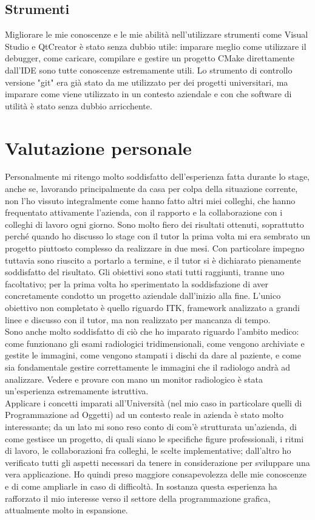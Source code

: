 \subsection{Strumenti}
Migliorare le mie conoscenze e le mie abilità nell'utilizzare strumenti come Visual Studio e QtCreator è stato senza dubbio utile: imparare meglio come utilizzare il debugger, come caricare, compilare e gestire un progetto CMake direttamente dall'IDE sono tutte conoscenze estremamente utili. Lo strumento di controllo versione "git" era già stato da me utilizzato per dei progetti universitari, ma imparare come viene utilizzato in un contesto aziendale e con che software di utilità è stato senza dubbio arricchente.

\section{Valutazione personale}
Personalmente mi ritengo molto soddisfatto dell'esperienza fatta durante lo stage, anche se, lavorando principalmente da casa per colpa della situazione corrente, non l'ho vissuto integralmente come hanno fatto altri miei colleghi, che hanno frequentato attivamente l'azienda, con il rapporto e la collaborazione con i colleghi di lavoro ogni giorno. Sono molto fiero dei risultati ottenuti, soprattutto perché quando ho discusso lo stage con il tutor la prima volta mi era sembrato un progetto piuttosto complesso da realizzare in due mesi. Con particolare impegno tuttavia sono riuscito a portarlo a termine, e il tutor si è dichiarato pienamente soddisfatto del risultato. Gli obiettivi sono stati tutti raggiunti, tranne uno facoltativo; per la prima volta ho sperimentato la soddisfazione di aver concretamente condotto un progetto aziendale dall'inizio alla fine. L'unico obiettivo non completato è quello riguardo ITK, framework analizzato a grandi linee e discusso con il tutor, ma non realizzato per mancanza di tempo.
\\
Sono anche molto soddisfatto di ciò che ho imparato riguardo l'ambito medico: come funzionano gli esami radiologici tridimensionali, come vengono archiviate e gestite le immagini, come vengono stampati i dischi da dare al paziente, e come sia fondamentale gestire correttamente le immagini che il radiologo andrà ad analizzare. Vedere e provare con mano un monitor radiologico è stata un'esperienza estremamente istruttiva.
\\
Applicare i concetti imparati all’Università (nel mio caso in particolare quelli di
Programmazione ad Oggetti) ad un contesto reale in azienda è stato molto interessante;
da un lato mi sono reso conto di com’è strutturata un’azienda, di come gestisce un progetto, di quali siano le specifiche figure professionali, i ritmi di lavoro, le collaborazioni fra colleghi, le scelte implementative; dall’altro ho verificato tutti gli aspetti necessari da tenere in considerazione per sviluppare una vera applicazione. Ho quindi preso maggiore consapevolezza delle mie conoscenze e di come ampliarle in caso di difficoltà. In sostanza questa esperienza ha rafforzato il mio interesse verso il settore della programmazione grafica, attualmente molto in espansione.

